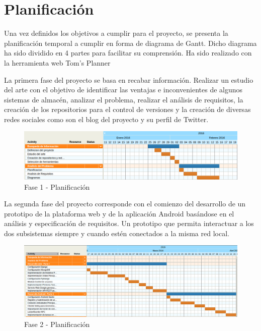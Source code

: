 \documentclass[a4paper,11pt]{book}
\begin{document}
\section{Planificación}

Una vez definidos los objetivos a cumplir para el proyecto, se presenta la planificación temporal a cumplir en forma de diagrama de Gantt. Dicho diagrama ha sido dividido en 4 partes para facilitar su comprensión. Ha sido realizado con la herramienta web Tom's Planner\cite{tomsplanner}

La primera fase del proyecto se basa en recabar información. Realizar un estudio del arte con el objetivo de identificar las ventajas e inconvenientes de algunos sistemas de almacén, analizar el problema, realizar el análisis de requisitos, la creación de los repositorios para el control de versiones y la creación de diversas redes sociales como son el blog\cite{blog} del proyecto y su perfil\cite{twitter} de Twitter. 

\begin{figure}[H] 
\centering 
\includegraphics[scale=0.35]{imagenes/planificacion/planificacion1.png}
\caption{ Fase 1 - Planificación\cite{propio}  }  
\end{figure}

La segunda fase del proyecto corresponde con el comienzo del desarrollo de un prototipo de la plataforma web y de la aplicación Android basándose en el análisis y especificación de requisitos. Un prototipo que permita interactuar a los dos subsistemas siempre y cuando estén conectados a la misma red local.

\begin{figure}[H] 
\centering 
\includegraphics[scale=0.35]{imagenes/planificacion/planificacion2.png}
\caption{ Fase 2 - Planificación\cite{propio}  }  
\end{figure}
\end{document}

